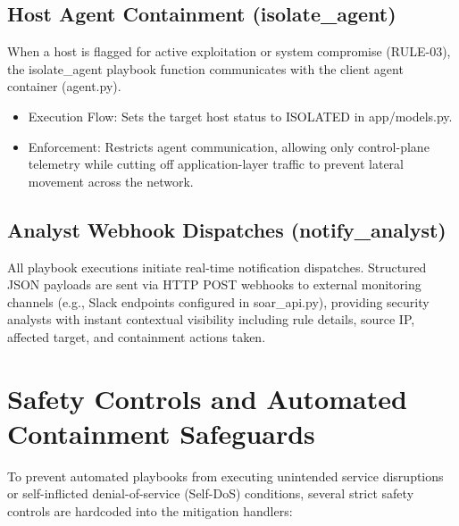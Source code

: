 \subsection{Host Agent Containment (isolate\_agent)}

When a host is flagged for active exploitation or system compromise (RULE-03), the isolate\_agent playbook function communicates with the client agent container (agent.py).

\begin{itemize}
  \item Execution Flow: Sets the target host status to ISOLATED in app/models.py.
  \item Enforcement: Restricts agent communication, allowing only control-plane telemetry while cutting off application-layer traffic to prevent lateral movement across the network.
\end{itemize}

\subsection{Analyst Webhook Dispatches (notify\_analyst)}

All playbook executions initiate real-time notification dispatches. Structured JSON payloads are sent via HTTP POST webhooks to external monitoring channels (e.g., Slack endpoints configured in soar\_api.py), providing security analysts with instant contextual visibility including rule details, source IP, affected target, and containment actions taken.

\section{Safety Controls and Automated Containment Safeguards}

To prevent automated playbooks from executing unintended service disruptions or self-inflicted denial-of-service (Self-DoS) conditions, several strict safety controls are hardcoded into the mitigation handlers:

